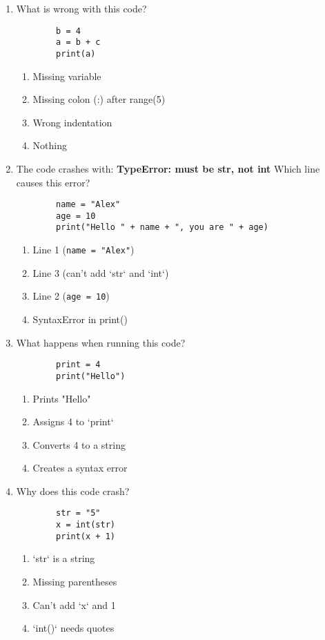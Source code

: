 \documentclass{article}
\begin{document}
    \begin{enumerate}
        \item What is wrong with this code?
        \begin{lstlisting}
        b = 4
        a = b + c
        print(a)
        \end{lstlisting}
        \begin{enumerate}[label=(\Alph*)]
            \item Missing variable
            \item Missing colon (:) after range(5)
            \item Wrong indentation
            \item Nothing
        \end{enumerate}

        \item The code crashes with:  
        \textbf{TypeError: must be str, not int}  
        Which line causes this error?  
        \begin{lstlisting}
        name = "Alex"
        age = 10
        print("Hello " + name + ", you are " + age)
        \end{lstlisting}

        \begin{enumerate}[label=(\Alph*)]
            \item Line 1 (\texttt{name = "Alex"})
            \item Line 3 (can't add `str` and `int`)
            \item Line 2 (\texttt{age = 10})
            \item SyntaxError in print()
        \end{enumerate}

        \item What happens when running this code?
        \begin{lstlisting}
        print = 4
        print("Hello")
        \end{lstlisting}
        \begin{enumerate}[label=(\Alph*)]
            \item Prints "Hello"
            \item Assigns 4 to `print`
            \item Converts 4 to a string
            \item Creates a syntax error
        \end{enumerate}

        \item Why does this code crash?
        \begin{lstlisting}
        str = "5"
        x = int(str)
        print(x + 1)
        \end{lstlisting}
        \begin{enumerate}[label=(\Alph*)]
            \item `str` is a string
            \item Missing parentheses
            \item Can't add `x` and 1
            \item `int()` needs quotes
        \end{enumerate}


\end{enumerate}
\end{document}
